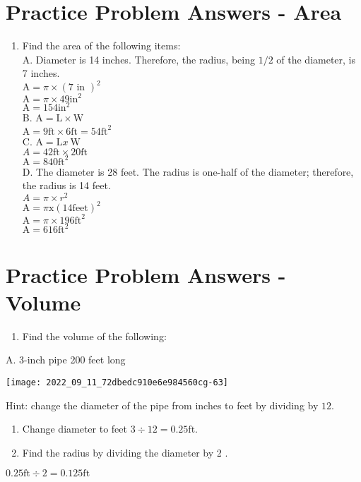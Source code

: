 \section{Practice Problem Answers - Area}
\begin{enumerate}
  \item Find the area of the following items:\\
A. Diameter is 14 inches. Therefore, the radius, being $1 / 2$ of the diameter, is 7 inches.\\
$\mathrm{A}=\pi \times(7 \text { in })^{2}$\\
$\mathrm{A}=\pi \times 49 \mathrm{in}^{2}$\\
$\mathrm{A}=154 \mathrm{in}^{2}$\\
B. $\mathrm{A}=\mathrm{L} \times \mathrm{W}$\\
$\mathrm{A}=9 \mathrm{ft} \times 6 \mathrm{ft}=54 \mathrm{ft}^{2}$\\
C. $\mathrm{A}=\mathrm{L} x \mathrm{~W}$\\
$A=42 \mathrm{ft} \times 20 \mathrm{ft}$\\
$\mathrm{A}=840 \mathrm{ft}^{2}$\\
D. The diameter is 28 feet. The radius is one-half of the diameter; therefore, the radius is 14 feet.\\
$A=\pi \times r^{2}$\\
$\mathrm{A}=\pi \mathrm{x}(14 \mathrm{feet})^{2}$\\
$\mathrm{A}=\pi \times 196 \mathrm{ft}^{2}$\\
$\mathrm{A}=616 \mathrm{ft}^{2}$
\end{enumerate}
\section{Practice Problem Answers - Volume}
\begin{enumerate}
  \item Find the volume of the following:
\end{enumerate}
A. 3-inch pipe 200 feet long

\texttt{[image: 2022\_09\_11\_72dbedc910e6e984560cg-63]}

Hint: change the diameter of the pipe from inches to feet by dividing by $12 .$

\begin{enumerate}
  \item Change diameter to feet $3 \div 12=0.25 \mathrm{ft}$.

  \item Find the radius by dividing the diameter by 2 .

\end{enumerate}
$0.25 \mathrm{ft} \div 2=0.125 \mathrm{ft}$

